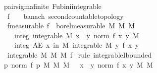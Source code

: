 \documentclass[leqno]{article}
\theoremstyle{definition}
\begin{document}
\begin{figure}
\begin{isabellebody}
\isamarkupfalse%
\ {\isacharparenleft}\ pair{\isacharunderscore}sigma{\isacharunderscore}finite{\isacharparenright}\ Fubini{\isacharunderscore}integrable{\isacharcolon}\isanewline
\ \ \ f\ {\isacharcolon}{\isacharcolon}\ {\isachardoublequoteopen}{\isacharunderscore}\ {\isasymRightarrow}\ {\isacharunderscore}{\isacharcolon}{\isacharcolon}{\isacharbraceleft}banach{\isacharcomma}\ second{\isacharunderscore}countable{\isacharunderscore}topology{\isacharbraceright}{\isachardoublequoteclose}\isanewline
\ \ \ f{\isacharbrackleft}measurable{\isacharbrackright}{\isacharcolon}\ {\isachardoublequoteopen}f\ {\isasymin}\ borel{\isacharunderscore}measurable\ {\isacharparenleft}M{}\ {\isasymOtimes}\isactrlsub M\ M{}{\isacharparenright}{\isachardoublequoteclose}\isanewline
\ \ \ \ \ integ{}{\isacharcolon}\ {\isachardoublequoteopen}integrable\ M{}\ {\isacharparenleft}{\isasymlambda}x{\isachardot}\ {\isasymintegral}\ y{\isachardot}\ norm\ {\isacharparenleft}f\ {\isacharparenleft}x{\isacharcomma}\ y{\isacharparenright}{\isacharparenright}\ {\isasympartial}M{}{\isacharparenright}{\isachardoublequoteclose}\isanewline
\ \ \ \ \ integ{}{\isacharcolon}\ {\isachardoublequoteopen}AE\ x\ in\ M{}{\isachardot}\ integrable\ M{}\ {\isacharparenleft}{\isasymlambda}y{\isachardot}\ f\ {\isacharparenleft}x{\isacharcomma}\ y{\isacharparenright}{\isacharparenright}{\isachardoublequoteclose}\isanewline
\ \ \ {\isachardoublequoteopen}integrable\ {\isacharparenleft}M{}\ {\isasymOtimes}\isactrlsub M\ M{}{\isacharparenright}\ f{\isachardoublequoteclose}\isanewline
{}\isamarkupfalse%
\ {\isacharparenleft}rule\ integrableI{\isacharunderscore}bounded{\isacharparenright}\isanewline
\ \ \isamarkupfalse%
\ {\isachardoublequoteopen}{\isacharparenleft}{\isasymintegral}\isactrlsup {\isacharplus}\ p{\isachardot}\ norm\ {\isacharparenleft}f\ p{\isacharparenright}\ {\isasympartial}{\isacharparenleft}M{}\ {\isasymOtimes}\isactrlsub M\ M{}{\isacharparenright}{\isacharparenright}\ {\isacharequal}\ {\isacharparenleft}{\isasymintegral}\isactrlsup {\isacharplus}\ x{\isachardot}\ {\isacharparenleft}{\isasymintegral}\isactrlsup {\isacharplus}\ y{\isachardot}\ norm\ {\isacharparenleft}f\ {\isacharparenleft}x{\isacharcomma}\ y{\isacharparenright}{\isacharparenright}\ {\isasympartial}M{}{\isacharparenright}\ {\isasympartial}M{}{\isacharparenright}{\isachardoublequoteclose}\isanewline

\end{isabellebody}
\end{figure}
\end{document}
